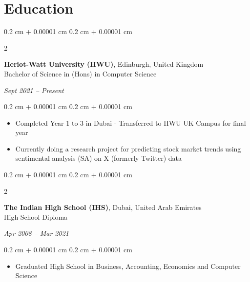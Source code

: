 \documentclass[10pt, letterpaper]{article}
\newenvironment{highlights}{
    \begin{itemize}[
        topsep=0.10 cm,
        parsep=0.10 cm,
        partopsep=0pt,
        itemsep=0pt,
        leftmargin=0.4 cm + 10pt
    ]
}{
    \end{itemize}
} %
\newenvironment{onecolentry}{
    \begin{adjustwidth}{
        0.2 cm + 0.00001 cm
    }{
        0.2 cm + 0.00001 cm
    }
}{
    \end{adjustwidth}
} %
\newenvironment{twocolentry}[2][]{
    \onecolentry
    \def\secondColumn{#2}
    \setcolumnwidth{\fill, 4.5 cm}
    \begin{paracol}{2}
}{
    \switchcolumn \raggedleft \secondColumn
    \end{paracol}
    \endonecolentry
} %
\begin{document}
    \section{Education}
    \begin{twocolentry}{
        \textit{Sept 2021 – Present}}
            \textbf{Heriot-Watt University (HWU)}, Edinburgh, United Kingdom 
            \\ Bachelor of Science in (Hons) in Computer Science
    \end{twocolentry}
    \vspace{0.10 cm}
    \begin{onecolentry}
        \begin{highlights}
            \item Completed Year 1 to 3 in Dubai - Transferred to HWU UK Campus for final year
        \end{highlights}
         \begin{highlights}
            \item Currently doing a research project for predicting stock market trends using sentimental analysis (SA) on X (formerly Twitter) data
        \end{highlights}
    \end{onecolentry}

    \vspace{0.2 cm}

    \begin{twocolentry}{
        \textit{Apr 2008 – Mar 2021}}
        \textbf{The Indian High School (IHS)}, Dubai, United Arab Emirates
        \\ High School Diploma
    \end{twocolentry}
    \vspace{0.10 cm}
    \begin{onecolentry}
        \begin{highlights}
            \item Graduated High School in Business, Accounting, Economics and Computer Science 
        \end{highlights}
    \end{onecolentry}
\end{document}
